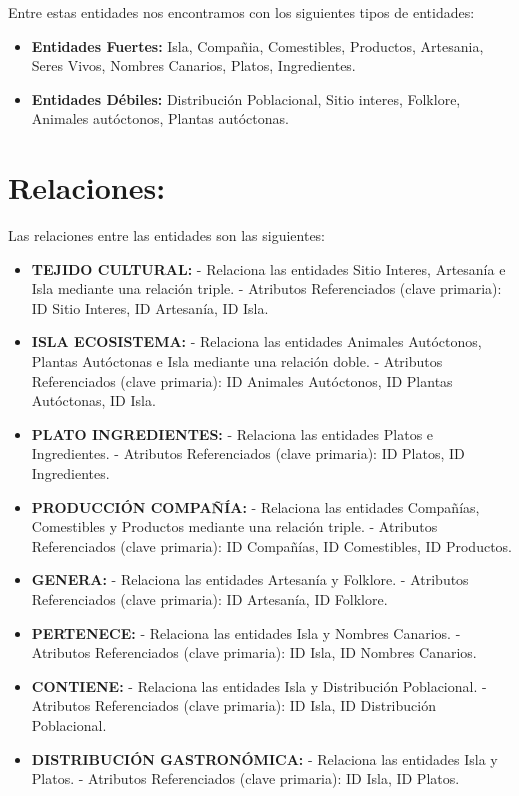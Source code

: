 \documentclass[11pt]{report}
\begin{document}
Entre estas entidades nos encontramos con los siguientes tipos de entidades:
\begin{itemize}
      \item \textbf{Entidades Fuertes:} Isla, Compañia, Comestibles, Productos, Artesania, Seres Vivos, Nombres Canarios, Platos, Ingredientes.
      \item \textbf{Entidades Débiles:} Distribución Poblacional, Sitio interes, Folklore, Animales autóctonos, Plantas autóctonas.
\end{itemize}

\section{Relaciones:}
Las relaciones entre las entidades son las siguientes:

\begin{itemize}
      \item \textbf{TEJIDO CULTURAL:}
            \subitem - Relaciona las entidades Sitio Interes, Artesanía e Isla mediante una relación triple.
            \subitem - Atributos Referenciados (clave primaria): ID Sitio Interes, ID Artesanía, ID Isla.
      \item \textbf{ISLA ECOSISTEMA:}
            \subitem - Relaciona las entidades Animales Autóctonos, Plantas Autóctonas e Isla mediante una relación doble.
            \subitem - Atributos Referenciados (clave primaria): ID Animales Autóctonos, ID Plantas Autóctonas, ID Isla.
      \item \textbf{PLATO INGREDIENTES:}
            \subitem - Relaciona las entidades Platos e Ingredientes.
            \subitem - Atributos Referenciados (clave primaria): ID Platos, ID Ingredientes.
      \item \textbf{PRODUCCIÓN COMPAÑÍA:}
            \subitem - Relaciona las entidades Compañías, Comestibles y Productos mediante una relación triple.
            \subitem - Atributos Referenciados (clave primaria): ID Compañías, ID Comestibles, ID Productos.
      \item \textbf{GENERA:}
            \subitem - Relaciona las entidades Artesanía y Folklore.
            \subitem - Atributos Referenciados (clave primaria): ID Artesanía, ID Folklore.
      \item \textbf{PERTENECE:}
            \subitem - Relaciona las entidades Isla y Nombres Canarios.
            \subitem - Atributos Referenciados (clave primaria): ID Isla, ID Nombres Canarios.
      \item \textbf{CONTIENE:}
            \subitem - Relaciona las entidades Isla y Distribución Poblacional.
            \subitem - Atributos Referenciados (clave primaria): ID Isla, ID Distribución Poblacional.
      \item \textbf{DISTRIBUCIÓN GASTRONÓMICA:}
            \subitem - Relaciona las entidades Isla y Platos.
            \subitem - Atributos Referenciados (clave primaria): ID Isla, ID Platos.
\end{itemize}
\end{document}
